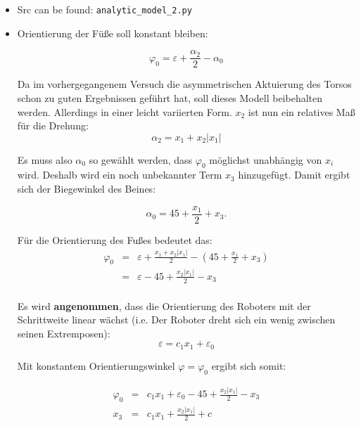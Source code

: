 \documentclass[10pt,a4paper]{article}
\begin{document}
\begin{itemize}

\item Src can be found: \texttt{analytic\_model\_2.py}

\item Orientierung der Füße soll konstant bleiben:

\begin{equation}
\varphi_0 = \varepsilon + \frac{\alpha_2}{2} - \alpha_0
\end{equation}

Da im vorhergegangenem Versuch die asymmetrischen Aktuierung des Torsos schon zu guten Ergebnissen geführt hat, soll dieses Modell beibehalten werden. Allerdings in einer leicht variierten Form. $x_2$ ist nun ein relatives Maß für die Drehung:
\begin{equation}
\alpha_2 = x_1 + x_2|x_1|
\end{equation}


Es muss also $\alpha_0$ so gewählt werden, dass $\varphi_0$ möglichst unabhängig von $x_i$ wird.
Deshalb wird ein noch unbekannter Term $x_3$ hinzugefügt. Damit ergibt sich der Biegewinkel des Beines:

\begin{equation}
\alpha_0 = 45+ \frac{x_1}{2} + x_3.
\end{equation}

Für die Orientierung des Fußes bedeutet das:
\begin{eqnarray}
\varphi_0 &=& \varepsilon + \frac{x_1 + x_2|x_1|}{2} - \left( 45 + \frac{x_1}{2} + x_3 \right) \\
			&=& \varepsilon -45 + \frac{x_2|x_1|}{2} -x_3 \\
\end{eqnarray}

Es wird \textbf{angenommen}, dass die Orientierung des Roboters mit der Schrittweite linear wächst (i.e. Der Roboter dreht sich ein wenig zwischen seinen Extremposen):
\begin{equation}
\varepsilon = c_1 x_1 + \varepsilon_0
\end{equation}

Mit konstantem Orientierungswinkel $\varphi = \varphi_0$ ergibt sich somit:

\begin{eqnarray}
\varphi_0 &=& c_1 x_1 + \varepsilon_0 - 45 + \frac{x_2|x_1|}{2} -x_3 \\
x_3 &=&  c_1 x_1 + \frac{x_2|x_1|}{2} + c
\end{eqnarray}


\end{itemize}
\end{document}
